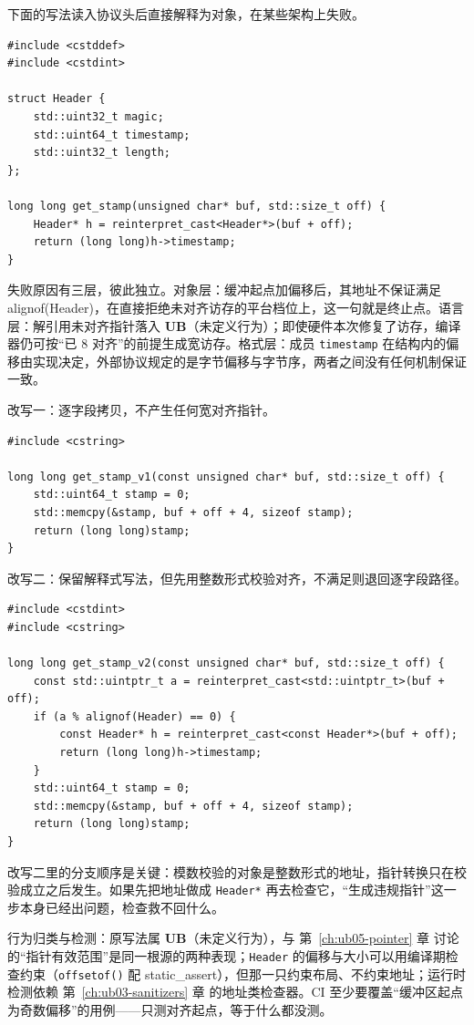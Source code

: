\documentclass[12pt,a4paper,fontset=fandol]{ctexbook}
\newcommand{\Fn}[1]{\texttt{#1()}}
\newcommand{\Tp}[1]{\texttt{#1}}
\newcommand{\Lang}[1]{\textsf{#1}}
\newcommand{\UB}{\textbf{\textsf{UB}}}
\newcommand{\Feat}[1]{\texttt{#1}}
\begin{document}
\begin{casebox}[title={把外部协议头直接强转成含 64 位成员的结构}]
下面的写法读入协议头后直接解释为对象，在某些架构上失败。

\begin{lstlisting}[style=cppstyle,caption={原写法：缓冲区起点加偏移后直接双关为宽类型对象}]
#include <cstddef>
#include <cstdint>

struct Header {
    std::uint32_t magic;
    std::uint64_t timestamp;
    std::uint32_t length;
};

long long get_stamp(unsigned char* buf, std::size_t off) {
    Header* h = reinterpret_cast<Header*>(buf + off);
    return (long long)h->timestamp;
}
\end{lstlisting}

失败原因有三层，彼此独立。对象层：缓冲起点加偏移后，其地址不保证满足 \Lang{alignof}(Header)，在直接拒绝未对齐访存的平台档位上，这一句就是终止点。语言层：解引用未对齐指针落入 \UB（未定义行为）；即使硬件本次修复了访存，编译器仍可按“已 8 对齐”的前提生成宽访存。格式层：成员 \Feat{timestamp} 在结构内的偏移由实现决定，外部协议规定的是字节偏移与字节序，两者之间没有任何机制保证一致。

改写一：逐字段拷贝，不产生任何宽对齐指针。

\begin{lstlisting}[style=cppstyle,caption={改写一：字节先落到局部对象，指针从不越出函数}]
#include <cstring>

long long get_stamp_v1(const unsigned char* buf, std::size_t off) {
    std::uint64_t stamp = 0;
    std::memcpy(&stamp, buf + off + 4, sizeof stamp);
    return (long long)stamp;
}
\end{lstlisting}

改写二：保留解释式写法，但先用整数形式校验对齐，不满足则退回逐字段路径。

\begin{lstlisting}[style=cppstyle,caption={改写二：校验在先，类型转换在后}]
#include <cstdint>
#include <cstring>

long long get_stamp_v2(const unsigned char* buf, std::size_t off) {
    const std::uintptr_t a = reinterpret_cast<std::uintptr_t>(buf + off);
    if (a % alignof(Header) == 0) {
        const Header* h = reinterpret_cast<const Header*>(buf + off);
        return (long long)h->timestamp;
    }
    std::uint64_t stamp = 0;
    std::memcpy(&stamp, buf + off + 4, sizeof stamp);
    return (long long)stamp;
}
\end{lstlisting}

改写二里的分支顺序是关键：模数校验的对象是整数形式的地址，指针转换只在校验成立之后发生。如果先把地址做成 \Tp{Header*} 再去检查它，“生成违规指针”这一步本身已经出问题，检查救不回什么。

行为归类与检测：原写法属 \UB（未定义行为），与 第~\ref{ch:ub05-pointer} 章 讨论的“指针有效范围”是同一根源的两种表现；\Feat{Header} 的偏移与大小可以用编译期检查约束（\Fn{offsetof} 配 \Lang{static\_assert}），但那一只约束布局、不约束地址；运行时检测依赖 第~\ref{ch:ub03-sanitizers} 章 的地址类检查器。CI 至少要覆盖“缓冲区起点为奇数偏移”的用例——只测对齐起点，等于什么都没测。
\end{casebox}
\end{document}
